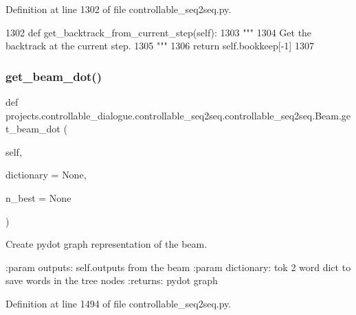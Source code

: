 Definition at line 1302 of file controllable\+\_\+seq2seq.\+py.


\begin{DoxyCode}
1302     \textcolor{keyword}{def }get\_backtrack\_from\_current\_step(self):
1303         \textcolor{stringliteral}{"""}
1304 \textcolor{stringliteral}{        Get the backtrack at the current step.}
1305 \textcolor{stringliteral}{        """}
1306         \textcolor{keywordflow}{return} self.bookkeep[-1]
1307 
\end{DoxyCode}
\mbox{\label{classprojects_1_1controllable__dialogue_1_1controllable__seq2seq_1_1controllable__seq2seq_1_1Beam_aba2e2034d56689b4d77be75d024beaef}} 
\subsubsection{\texorpdfstring{get\+\_\+beam\+\_\+dot()}{get\_beam\_dot()}}
{\footnotesize\ttfamily def projects.\+controllable\+\_\+dialogue.\+controllable\+\_\+seq2seq.\+controllable\+\_\+seq2seq.\+Beam.\+get\+\_\+beam\+\_\+dot (\begin{DoxyParamCaption}\item[{}]{self,  }\item[{}]{dictionary = {\ttfamily None},  }\item[{}]{n\+\_\+best = {\ttfamily None} }\end{DoxyParamCaption})}

\begin{DoxyVerb}Create pydot graph representation of the beam.

:param outputs:
    self.outputs from the beam
:param dictionary:
    tok 2 word dict to save words in the tree nodes
:returns:
    pydot graph
\end{DoxyVerb}
 

Definition at line 1494 of file controllable\+\_\+seq2seq.\+py.


